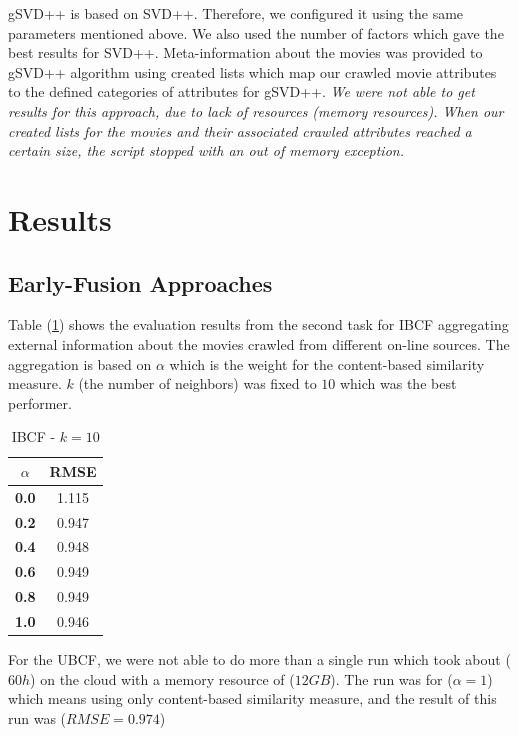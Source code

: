 \documentclass{sigish}
\begin{document}
gSVD++ is based on SVD++. Therefore, we configured it using the same parameters mentioned above. We also used the number of factors which gave the best results for SVD++. Meta-information about the movies was provided to gSVD++ algorithm using created lists which map our crawled movie attributes to the defined categories of attributes for gSVD++.
\emph{We were not able to get results for this approach, due to lack of resources (memory resources). When our created lists for the movies and their associated crawled attributes reached a certain size, the script stopped with an out of memory exception.}

\section{Results}
\label{sec:results}
\subsection{Early-Fusion Approaches}
Table (\ref{tab:ibcf_results}) shows the evaluation results from the second task for IBCF aggregating external information about the movies crawled from different on-line sources. The aggregation is based on $ \alpha $ which is the weight for the content-based similarity measure. $ k $ (the number of neighbors) was fixed to $ 10 $ which was the best performer.

\begin{table}[]
	\centering
	\begin{tabular}{|c|c|}
		\hline
		\textbf{$ \alpha $} & \textbf{RMSE} \\ \hline
		\textbf{0.0} & 1.115        \\ \hline
		\textbf{0.2} & 0.947        \\ \hline
		\textbf{0.4} & 0.948        \\ \hline
		\textbf{0.6} & 0.949        \\ \hline
		\textbf{0.8} & 0.949        \\ \hline
		\textbf{1.0} & 0.946        \\ \hline
		
	\end{tabular}
	\caption{IBCF - $ k = 10 $}
	\label{tab:ibcf_results}
\end{table}

For the UBCF, we were not able to do more than a single run which took about ($ 60h $) on the cloud with a memory resource of ($ 12 GB $). The run was for ($ \alpha = 1 $) which means using only content-based similarity measure, and the result of this run was ($ RMSE = 0.974 $)
\end{document}
